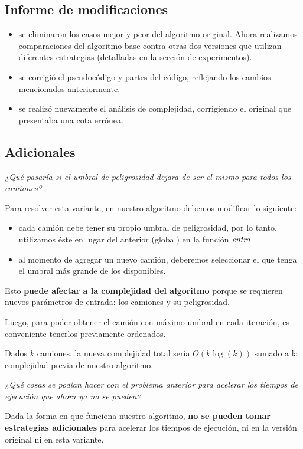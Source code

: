 \subsection{Informe de modificaciones}

\begin{itemize}
  \item se eliminaron los casos mejor y peor del algoritmo original. Ahora
  realizamos comparaciones del algoritmo base contra otras dos versiones
  que utilizan diferentes estrategias (detalladas en la sección de experimentos).

  \item se corrigió el pseudocódigo y partes del código, reflejando los
  cambios mencionados anteriormente.

  \item se realizó nuevamente el análisis de complejidad, corrigiendo
  el original que presentaba una cota errónea.
\end{itemize}


\newpage
\subsection{Adicionales}

\textit{¿Qué pasaría si el umbral de peligrosidad dejara de ser el mismo para todos los
camiones?}

\vspace*{0.25cm}

Para resolver esta variante, en nuestro algoritmo debemos modificar lo
siguiente:
\begin{itemize}
  \item cada camión debe tener su propio umbral de peligrosidad, por lo tanto,
        utilizamos éste en lugar del anterior (global) en la función $\id{entra}$

  \item al momento de agregar un nuevo camión, deberemos seleccionar el que tenga
        el umbral más grande de los disponibles.
\end{itemize}

Esto \textbf{puede afectar a la complejidad del algoritmo} porque se requieren nuevos
parámetros de entrada: los camiones y su peligrosidad.

Luego, para poder obtener el camión con máximo umbral en cada iteración, es
conveniente tenerlos previamente ordenados.

Dados $k$ camiones, la nueva complejidad total sería $O(k \log(k))$ sumado a la
complejidad previa de nuestro algoritmo.

\vspace*{0.75cm}

\textit{¿Qué cosas se podían hacer con el problema anterior para acelerar los tiempos de
ejecución que ahora ya no se pueden?}

\vspace*{0.25cm}

Dada la forma en que funciona nuestro algoritmo, \textbf{no se pueden tomar estrategias adicionales}
para acelerar los tiempos de ejecución, ni en la versión original ni en esta variante.

